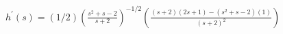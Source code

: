 $ \displaystyle h^{\prime}(s) = (1/2) \left(\frac{s^2 + s - 2}{s + 2} \right)^{-1/2} \left(\frac{(s + 2)(2s + 1) - (s^2 + s - 2)(1)}{(s + 2)^2}\right)$